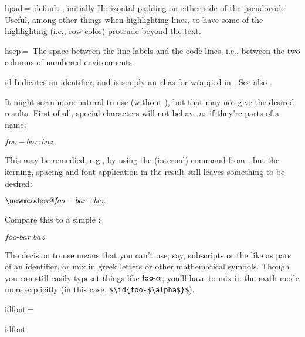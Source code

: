 \documentclass[a4paper]{article}
\def\refc{\refCom*}
\begin{document}
\begin{docKey}{hpad}{\,=\,}%
    {default \code{0.3em}, initially \code{0em}}
    Horizontal padding on either side of the pseudocode. Useful, among other
    things when highlighting lines, to have some of the highlighting (i.e.,
    row color) protrude beyond the text.
\end{docKey}

\begin{docKey}{hsep}{\,=\,}%
    {\initialkeyvalue{\code{0.75em}}}
    The space between the line labels and the code lines, i.e., between the
    two columns of numbered  environments.
\end{docKey}

\begin{docCommand}{id}{}
    Indicates an identifier, and is simply an alias for  wrapped in
    .
    See also \refc{DeclarePseudoIdentifier}.

    \medskip

    It might seem more natural to use  (without ), but
    that may not give the desired results. First of all, special characters
    will not behave as if they're parts of a name:

\begin{texexp}
$\mathit{foo-bar:baz}$
\end{texexp}

    This may be remedied, e.g., by using the (internal) command
     from , but the
    kerning, spacing and font application in the result still leaves something
    to be desired:

\makeatletter
\begin{texexp}
$\mathit{\newmcodes@ foo-bar:baz}$
\end{texexp}
\makeatother

    Compare this to a simple :

\begin{texexp}
$\textit{foo-bar:baz}$
\end{texexp}

    The decision to use  means that you can't use, say, subscripts
    or the like as pars of an identifier, or mix in greek letters or other
    mathematical symbols. Though you can still easily typeset things like
    $\textsf{foo-$\alpha$}$, you'll have to mix in the math mode more
    explicitly (in this case, \verb|$\id{foo-$\alpha$}$|).
%
\end{docCommand}
\begin{docKey}{idfont}{\,=\,}{}
\end{docKey}
\begin{docCommand}{idfont}{}{}
\end{docCommand}
\end{document}

